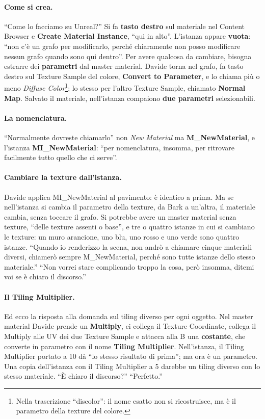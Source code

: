 \paragraph{Come si crea.} ``Come lo facciamo su Unreal?'' Si fa \textbf{tasto destro}
sul materiale nel Content Browser e \textbf{Create Material Instance}, ``qui in
alto''. L'istanza appare \textbf{vuota}: ``non c'è un grafo per modificarlo, perché
chiaramente non posso modificare nessun grafo quando sono qui dentro''. Per avere
qualcosa da cambiare, bisogna estrarre dei \textbf{parametri} dal master material.
Davide torna nel grafo, fa tasto destro sul Texture Sample del colore, \textbf{Convert
to Parameter}, e lo chiama più o meno \emph{Diffuse Color}\footnote{Nella trascrizione
``discolor'': il nome esatto non si ricostruisce, ma è il parametro della texture del
colore.}; lo stesso per l'altro Texture Sample, chiamato \textbf{Normal Map}. Salvato il
materiale, nell'istanza compaiono \textbf{due parametri} selezionabili.

\paragraph{La nomenclatura.} ``Normalmente dovreste chiamarlo'' non \emph{New Material}
ma \textbf{M\_NewMaterial}, e l'istanza \textbf{MI\_NewMaterial}: ``per nomenclatura,
insomma, per ritrovare facilmente tutto quello che ci serve''.

\paragraph{Cambiare la texture dall'istanza.} Davide applica MI\_NewMaterial al
pavimento: è identico a prima. Ma se nell'istanza si cambia il parametro della texture,
da Bark a un'altra, il materiale cambia, senza toccare il grafo. Si potrebbe avere un
master material senza texture, ``delle texture assenti o base'', e tre o quattro
istanze in cui si cambiano le texture: un muro arancione, uno blu, uno rosso e uno verde
sono quattro istanze. ``Quando io renderizzo la scena, non andrò a chiamare cinque
materiali diversi, chiamerò sempre M\_NewMaterial, perché sono tutte istanze dello
stesso materiale.'' ``Non vorrei stare complicando troppo la cosa, però insomma, ditemi
voi se è chiaro il discorso.''

\paragraph{Il Tiling Multiplier.} Ed ecco la risposta alla domanda sul tiling diverso
per ogni oggetto. Nel master material Davide prende un \textbf{Multiply}, ci collega il
Texture Coordinate, collega il Multiply alle UV dei due Texture Sample e attacca alla B
una \textbf{costante}, che converte in parametro con il nome \textbf{Tiling
Multiplier}. Nell'istanza, il Tiling Multiplier portato a 10 dà ``lo stesso risultato di
prima''; ma ora è un parametro. Una copia dell'istanza con il Tiling Multiplier a 5
darebbe un tiling diverso con lo stesso materiale. ``È chiaro il discorso?''
``Perfetto.''

